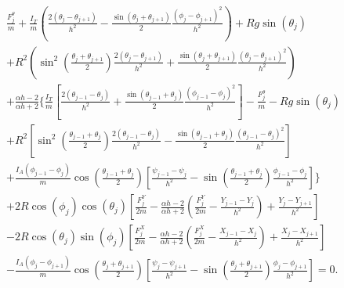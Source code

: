 \documentclass{aims}
\numberwithin{equation}{section}
\theoremstyle{definition}
\begin{document}
\begin{equation}
    \begin{split}
        &\frac{F^{\theta}_j}{m} + \frac{I_T}{m} \left(\frac{2(\theta_j - \theta_{j+1})}{h^2} - \frac{\sin(\theta_j+\theta_{j+1})}{2} \frac{(\phi_j - \phi_{j+1})^2}{h^2}\right)+R g\sin(\theta_j)\\
  &+R^2\left( \sin^2\left(\frac{\theta_j + \theta_{j+1}}{2}\right) \frac{2(\theta_j - \theta_{j+1})}{h^2} + \frac{\sin(\theta_j+\theta_{j+1})}{2} \frac{(\theta_j - \theta_{j+1})^2}{h^2}\right)\\
  &+\frac{\alpha h-2}{\alpha h+2} \Bigg\{ \frac{I_T}{m} \left[\frac{2(\theta_{j-1} - \theta_j)}{h^2} + \frac{\sin(\theta_{j-1}+\theta_j)}{2}\frac{(\phi_{j-1} - \phi_j)^2}{h^2}\right] - \frac{F^{\theta}_j}{m}- R g \sin(\theta_j)\\
  &+R^2 \left[\sin^2\left(\frac{\theta_{j-1} + \theta_j}{2}\right) \frac{2(\theta_{j-1} -  \theta_j)}{h^2} - \frac{\sin(\theta_{j-1}+\theta_j)}{2} \frac{(\theta_{j-1} - \theta_j)^2}{h^2}\right]\\
  &+\frac{I_A (\phi_{j-1} - \phi_j)}{m} \cos\left(\frac{\theta_{j-1} + \theta_j}{2}\right) \left[\frac{\psi_{j-1} - \psi_j}{h^2} - \sin\left(\frac{\theta_{j-1} + \theta_j}{2}\right) \frac{\phi_{j-1} - \phi_j}{h^2}\right] \Bigg\}\\
  &+2R \cos(\phi_j) \cos(\theta_j) \left[\frac{F^Y_j}{2m} - \frac{\alpha h-2}{\alpha h+2}\left(\frac{F^Y_j}{2m} - \frac{Y_{j-1} - Y_j}{h^2}\right) + \frac{Y_j - Y_{j+1}}{h^2}\right]\\
  &-2R \cos(\theta_j) \sin(\phi_j) \left[\frac{F^X_j}{2m} - \frac{\alpha h-2}{\alpha h+2}\left(\frac{F^X_j}{2m} - \frac{X_{j-1} - X_j}{h^2}\right) + \frac{X_j - X_{j+1}}{h^2} \right]\\
  & - \frac{I_A(\phi_j - \phi_{j+1})}{m}\cos\left(\frac{\theta_j + \theta_{j+1}}{2}\right)  \left[\frac{\psi_j - \psi_{j+1}}{h^2} - \sin\left(\frac{\theta_j + \theta_{j+1}}{2}\right) \frac{\phi_j - \phi_{j+1}}{h^2}\right]  = 0.
    \end{split}
\end{equation}
\end{document}

